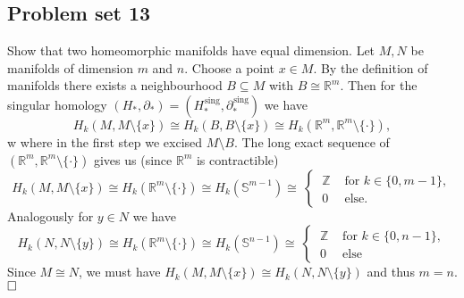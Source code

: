 \documentclass[11pt]{book}
\numberwithin{dummy}{section}
\theoremstyle{nonumberbreak}
\newenvironment{sol}[1][]{\ifthenelse{\equal{#1}{}}{\solution}{\solution[#1]}\rm}{\endsolution}
\newenvironment{prob}[1][]{\ifthenelse{\equal{#1}{}}{\problem}{\problem[#1]}\rm}{\endproblem}
\newcommand{\Sph}{\mathbb{S}}
\newcommand{\Z}{\mathbb{Z}}
\newcommand{\parts}{\partial^{\hspace{1pt} \mathrm{sing}}}
\newcommand{\Hs}{H^{\hspace{1pt}\mathrm{sing}}}
\begin{document}
\begin{spacing}{1.4}
\newpage 




\titlespacing*{\section}{-16.5pt}{0pt}{20pt}
\renewcommand*\thesection{}
\section{Problem set 13} %
\renewcommand*\thesection{\arabic{section}}






\begin{prob} %
Show that two homeomorphic manifolds have equal dimension.
\begin{sol}
Let $M,N$ be manifolds of dimension $m$ and $n$. Choose a point $x \in M$. By the definition of manifolds there exists a neighbourhood $B \subseteq M$ with $B \cong \mathbb{R}^m$. Then for the singular homology $(H_*, \partial_*) = (\Hs_*, \parts_*)$ we have 
$$H_k(M, M\setminus \{x\}) \cong H_k(B,B\setminus \{x\}) \cong H_k(\mathbb{R}^m, \mathbb{R}^m\setminus \{\cdot\}),$$w
where in the first step we excised $M \setminus B$. The long exact sequence of $(\mathbb{R}^m, \mathbb{R}^m\setminus \{\cdot\})$ gives us (since $\mathbb{R}^m$ is contractible)
$$H_k(M,M \setminus \{x\}) \cong H_k(\mathbb{R}^m \setminus \{\cdot\}) \cong H_k(\mathbb{S}^{m-1}) \cong \ \begin{cases} \ \Z & \textrm{ for } k\in \{0, m-1\}, \\ \ 0 &\textrm{ else.} \end{cases} $$
Analogously for $y \in N$ we have 
$$H_k(N, N \setminus \{y\}) \cong H_k(\mathbb{R}^m \setminus \{\cdot\}) \cong H_k(\Sph^{n-1}) \cong \ \begin{cases} \ \Z &\textrm{ for } k \in \{0, n-1\}, \\ \ 0 &\textrm{ else} \end{cases}$$
Since $M \cong N$, we must have $H_k(M, M \setminus \{x\}) \cong H_k(N,N\setminus \{y\})$ and thus $m=n$. $\hfill \Box$

\end{sol}
\end{prob}


\end{spacing}
\end{document}
